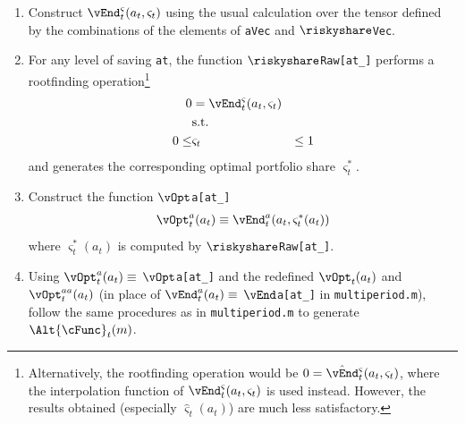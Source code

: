 \documentclass[titlepage, headings=optiontotocandhead]{\econtex}
\begin{document}
\begin{enumerate}

\item Construct
  $\vEnd_{t}^{\varsigma}({a}_{t},\varsigma_{t})$ using the usual calculation
  over the tensor defined by the combinations of the elements of
  \texttt{aVec} and \texttt{$\riskyshare$Vec}.

\item For any level of saving \texttt{at}, the function \texttt{$\riskyshare$Raw[at\_]} performs a rootfinding
  operation\footnote{Alternatively, the rootfinding operation would be
    $0 = \hat{\vEnd}^{\varsigma}_{t}({a}_{t},\varsigma_{t})$, where the
    interpolation function of $\vEnd_{t}^{\varsigma}({a}_{t},\varsigma_{t})$ is
    used instead. However, the results obtained (especially
    $\hat{\varsigma}_{t}({a}_{t})$) are much less satisfactory.}
  \begin{equation}\begin{gathered}\begin{aligned}
        0  & = \vEnd^{\varsigma}_{t}({a}_{t},\varsigma_{t})
        \\      & \text{s.t.} & \nonumber
        \\      0 \leq & \varsigma_{t} & \leq 1
      \end{aligned}\end{gathered}\end{equation}
  and generates the corresponding optimal portfolio share
  $\varsigma^{\ast}_{t}$.

\item Construct the function \texttt{$\vOpt$a[at\_]}
  \begin{equation}\begin{gathered}\begin{aligned}
        \vOpt_{t}^{a}({a}_{t}) \equiv
        \vEnd_{t}^{a}({a}_{t},\varsigma^{\ast}_{t}({a}_{t}))
      \end{aligned}\end{gathered}\end{equation}
  where $\varsigma^{\ast}_{t}({a}_{t})$ is computed by \texttt{$\riskyshare$Raw[at\_]}.

\item Using $\vOpt_{t}^{a}({a}_{t}) \equiv$
  \texttt{$\vOpt$a[at\_]} and the redefined
  $\vOpt_{t}({a}_{t})$ and $\vOpt_{t}^{{aa}}({a}_{t})$ (in
  place of $\vEnd_{t}^{a}({a}_{t}) \equiv $ \texttt{$\vEnd$a[at\_]} in
  \texttt{multiperiod.m}), follow the same procedures as in
  \texttt{multiperiod.m} to generate $\Alt{\cFunc}_{t}({m})$.

\end{enumerate}
\end{document}
